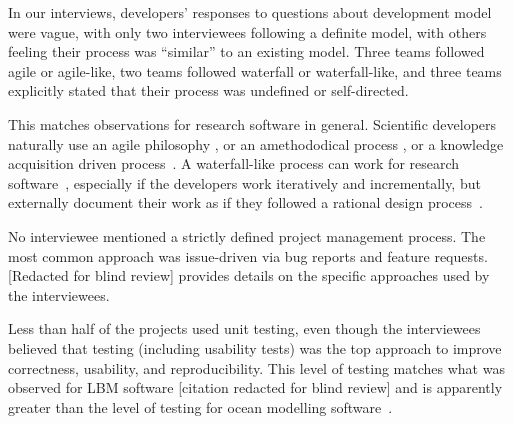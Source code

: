 \documentclass[doubleblind,12pt, 3p, times]{elsarticle}
\begin{document}
In our interviews, developers' responses to questions about development model
were vague, with only two interviewees following a definite model, with others
feeling their process was ``similar'' to an existing model.  Three teams
followed agile or agile-like, two teams followed waterfall or waterfall-like,
and three teams explicitly stated that their process was undefined or
self-directed.

This matches observations for research software in general.
Scientific developers naturally use an agile philosophy \cite{AckroydEtAl2008,
CarverEtAl2007, EasterbrookAndJohns2009, Segal2005, HeatonAndCarver2015}, or an
amethododical process \cite{Kelly2013}, or a knowledge acquisition driven
process~\cite{Kelly2015}.  A waterfall-like process can work for research
software~\cite{Smith2016}, especially if the developers work iteratively and
incrementally, but externally document their work as if they followed a
rational design process~\cite{parnas1986rational}.

No interviewee mentioned a strictly defined project management process. The most
common approach was issue-driven via bug reports and feature requests.
[Redacted for blind review] %
provides details on the specific approaches used by the interviewees.
% 

Less than half of the projects used unit testing, even
though the interviewees believed that testing (including usability tests) was
the top approach to improve correctness, usability, and reproducibility.  This
level of testing matches what was observed for LBM
software [citation redacted for blind review]
and is apparently greater than the level of
testing for ocean modelling software~\cite{JungEtAl2022}.
\end{document}
